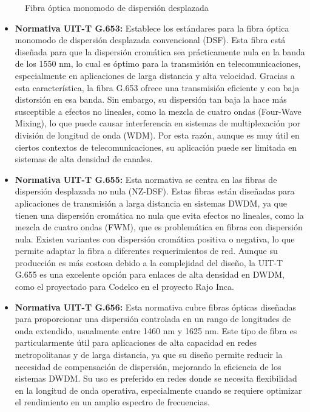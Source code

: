 \begin{enumerate}
\begin{figure}
		\caption{Fibra óptica monomodo de dispersión desplazada}
		\label{fig:1}
	\end{figure}
	\begin{itemize}
		\item \textbf{Normativa UIT-T G.653:} Establece los estándares para la fibra óptica monomodo de dispersión desplazada convencional (DSF). Esta fibra está diseñada para que la dispersión cromática sea prácticamente nula en la banda de los 1550 nm, lo cual es óptimo para la transmisión en telecomunicaciones, especialmente en aplicaciones de larga distancia y alta velocidad. Gracias a esta característica, la fibra G.653 ofrece una transmisión eficiente y con baja distorsión en esa banda. Sin embargo, su dispersión tan baja la hace más susceptible a efectos no lineales, como la mezcla de cuatro ondas (Four-Wave Mixing), lo que puede causar interferencia en sistemas de multiplexación por división de longitud de onda (WDM). Por esta razón, aunque es muy útil en ciertos contextos de telecomunicaciones, su aplicación puede ser limitada en sistemas de alta densidad de canales.
		
		\item \textbf{Normativa UIT-T G.655:} Esta normativa se centra en las fibras de dispersión desplazada no nula (NZ-DSF). Estas fibras están diseñadas para aplicaciones de transmisión a larga distancia en sistemas DWDM, ya que tienen una dispersión cromática no nula que evita efectos no lineales, como la mezcla de cuatro ondas (FWM), que es problemática en fibras con dispersión nula. Existen variantes con dispersión cromática positiva o negativa, lo que permite adaptar la fibra a diferentes requerimientos de red. Aunque su producción es más costosa debido a la complejidad del diseño, la UIT-T G.655 es una excelente opción para enlaces de alta densidad en DWDM, como el proyectado para Codelco en el proyecto Rajo Inca.
		
		\item \textbf{Normativa UIT-T G.656:} Esta normativa cubre fibras ópticas diseñadas para proporcionar una dispersión controlada en un rango de longitudes de onda extendido, usualmente entre 1460 nm y 1625 nm. Este tipo de fibra es particularmente útil para aplicaciones de alta capacidad en redes metropolitanas y de larga distancia, ya que su diseño permite reducir la necesidad de compensación de dispersión, mejorando la eficiencia de los sistemas DWDM. Su uso es preferido en redes donde se necesita flexibilidad en la longitud de onda operativa, especialmente cuando se requiere optimizar el rendimiento en un amplio espectro de frecuencias.
	\end{itemize}
	

\end{enumerate}
